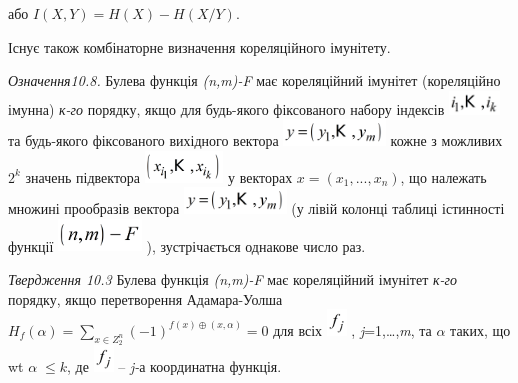 \documentclass[a4paper]{article}
\newcounter{}
\begin{document}
{\centering
або   ${I(X,Y)=H(X)-H(X/Y)}$.
\par}

Існує також комбінаторне визначення кореляційного імунітету.

\textit{Означення10.8.}\textit{ }Булева функція
\textit{(}\textit{n}\textit{,}\textit{m}\textit{)-}\textit{F}  має кореляційний
імунітет (кореляційно імунна) \textit{к-го }порядку, якщо для будь-якого
фіксованого набору індексів 
\includegraphics[width=0.528in,height=0.25in]{crypt-img/crypt-img216.png}  та
будь-якого фіксованого вихідного вектора 
\includegraphics[width=1.0693in,height=0.278in]{crypt-img/crypt-img217.png} 
кожне з можливих  ${2^{{k}}}$ значень підвектора 
\includegraphics[width=0.8193in,height=0.3335in]{crypt-img/crypt-img218.png}  у
векторах  ${x=(x_{{1}},\text{.}\text{.}\text{.},x_{{n}})}$, що належать множині
прообразів вектора 
\includegraphics[width=1.0693in,height=0.278in]{crypt-img/crypt-img219.png}  
(у лівій колонці таблиці істинності функції 
\includegraphics[width=0.8744in,height=0.3425in]{crypt-img/crypt-img220.png} ),
зустрічається однакове число раз.

\textit{Твердження 10.3}\textit{ }Булева функція
\textit{(}\textit{n}\textit{,}\textit{m}\textit{)-}\textit{F}  має кореляційний
імунітет \textit{к-го }порядку, якщо перетворення Адамара-Уолша 
${H_{{f}}(\alpha )=\underset{{x\in Z_{{2}}^{{n}}}}{\sum
}{(-1)^{{f(x){\oplus}(x,\alpha )}}}=0}$ для всіх 
\includegraphics[width=0.2083in,height=0.278in]{crypt-img/crypt-img221.png} ,
\textit{j}=1,…,\textit{m}, та   ${\alpha }$\textit{ }\textit{ }таких, що wt
${\alpha \;\le k}$, де 
\includegraphics[width=0.2083in,height=0.278in]{crypt-img/crypt-img222.png}  –
\textit{j-}а \textit{ }координатна функція.
\end{document}
